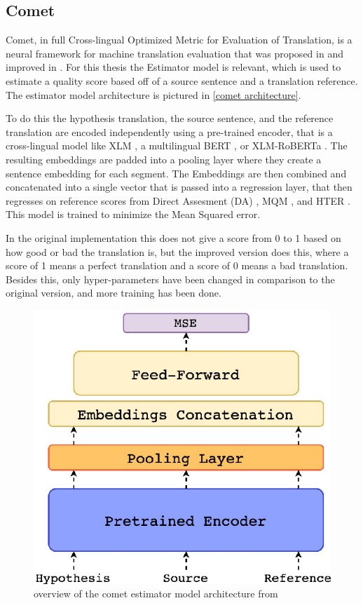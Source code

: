 \subsection{Comet}
Comet, in full Cross-lingual Optimized Metric for Evaluation of Translation, is a neural framework for machine translation evaluation that was proposed in \cite{rei-etal-2020-comet} and improved in \cite{rei-etal-2022-comet}.
For this thesis the Estimator model is relevant, which is used to estimate a quality score based off of a source sentence and a translation reference. The estimator model architecture is pictured in \autoref{comet architecture}.

To do this the hypothesis translation, the source sentence, and the reference translation are encoded independently using a pre-trained encoder, that is a cross-lingual model like XLM \cite{lample2019crosslinguallanguagemodelpretraining}, a multilingual BERT \cite{devlin2019bertpretrainingdeepbidirectional}, or XLM-RoBERTa \cite{conneau2020unsupervisedcrosslingualrepresentationlearning}. The resulting embeddings are padded into a pooling layer where they create a sentence embedding for each segment. The Embeddings are then combined and concatenated into a single vector that is passed into a regression layer, that then regresses on reference scores from Direct Assesment (DA) \cite{graham-etal-2013-continuous}, MQM \cite{mqm}, and HTER \cite{snover-etal-2006-study}.
This model is trained to minimize the Mean Squared error. 

In the original implementation this does not give a score from 0 to 1 based on how good or bad the translation is, but the improved version does this, where a score of 1 means a perfect translation and a score of 0 means a bad translation. Besides this, only hyper-parameters have been changed in comparison to the original version, and more training has been done.
\begin{figure}[ht]
    \centering
    \includegraphics[width=0.3\linewidth]{Latex//sections//images/cometestimatormodel.png}
    \caption{overview of the comet estimator model architecture from \cite{rei-etal-2020-comet}}
    \label{comet architecture}
\end{figure}


